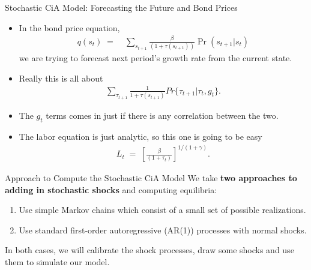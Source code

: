 \documentclass[10pt,c,aspectratio=1610,handout]{beamer}
\begin{document}
\begin{frame}{Stochastic CiA Model: Forecasting the Future and Bond Prices}%
  \begin{itemize}%
    \item[$\blacktriangleright$] In the bond price equation,%
    \begin{align*}%
      q(s_t) \; = & \; \sum_{s_{t+1}} \frac{\beta}{(1+\tau(s_{t+1}))}\Pr(s_{t+1}|s_t)%
    \end{align*}%
    we are trying to forecast next period's growth rate from the current state.%
    \pause%
    \item[$\blacktriangleright$] Really this is all about%
    \begin{align*}%
      \sum_{\tau_{t+1}} \frac{1}{1+\tau(s_{t+1})} Pr\{ \tau_{t+1} | \tau_t, g_t\}.%
    \end{align*}%
    \pause%
    \item[$\blacktriangleright$] The $g_t$ terms comes in just if there is any correlation between the two.%
    \begin{itemize}%
    \end{itemize}%
    \pause%
    \item[$\blacktriangleright$] The labor equation is just analytic, so this one is going to be easy%
    \begin{align*}%
      L_t \; = \; \left[ \frac{\beta}{(1 + \tau_t)} \right]^{1/(1+\gamma)}.%
    \end{align*}%
  \end{itemize}%
\end{frame}%
\begin{frame}{Approach to Compute the Stochastic CiA Model}%
  We take \textbf{two approaches to adding in stochastic shocks} and computing equilibria:%
  \vspace*{0.1in}%
  \pause%
  \begin{enumerate}%
    \item Use simple Markov chains which consist of a small set of possible realizations.%
    \pause%
    \item Use standard first-order autoregressive (AR(1)) processes with normal shocks.%
  \end{enumerate}%
  \vspace*{0.2in}%
  \pause%
  In both cases, we will calibrate the shock processes, draw some shocks and use them to simulate our model.%
\end{frame}%
\end{document}
